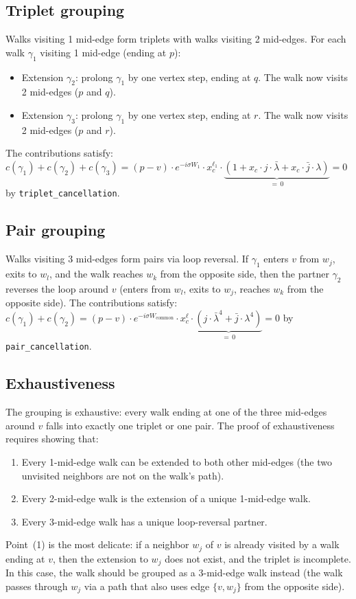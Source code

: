 \subsection{Triplet grouping}

Walks visiting 1 mid-edge form triplets with walks visiting 2 mid-edges.
For each walk $\gamma_1$ visiting 1 mid-edge (ending at $p$):
\begin{itemize}
\item Extension $\gamma_2$: prolong $\gamma_1$ by one vertex step, ending at $q$.
  The walk now visits 2 mid-edges ($p$ and $q$).
\item Extension $\gamma_3$: prolong $\gamma_1$ by one vertex step, ending at $r$.
  The walk now visits 2 mid-edges ($p$ and $r$).
\end{itemize}
The contributions satisfy:
$c(\gamma_1) + c(\gamma_2) + c(\gamma_3) =
(p-v) \cdot e^{-i\sigma W_1} \cdot x_c^{\ell_1}
\cdot \underbrace{(1 + x_c \cdot j \cdot \bar{\lambda} + x_c \cdot \bar{j} \cdot \lambda)}_{=\,0} = 0$
by \texttt{triplet\_cancellation}.

\subsection{Pair grouping}

Walks visiting 3 mid-edges form pairs via loop reversal. If $\gamma_1$ enters
$v$ from $w_j$, exits to $w_l$, and the walk reaches $w_k$ from the opposite
side, then the partner $\gamma_2$ reverses the loop around $v$
(enters from $w_l$, exits to $w_j$, reaches $w_k$ from the opposite side).
The contributions satisfy:
$c(\gamma_1) + c(\gamma_2) =
(p-v) \cdot e^{-i\sigma W_{\text{common}}} \cdot x_c^{\ell}
\cdot \underbrace{(j \cdot \bar{\lambda}^4 + \bar{j} \cdot \lambda^4)}_{=\,0} = 0$
by \texttt{pair\_cancellation}.

\subsection{Exhaustiveness}

The grouping is exhaustive: every walk ending at one of the three mid-edges
around $v$ falls into exactly one triplet or one pair. The proof of exhaustiveness
requires showing that:
\begin{enumerate}
\item Every 1-mid-edge walk can be extended to both other mid-edges
  (the two unvisited neighbors are not on the walk's path).
\item Every 2-mid-edge walk is the extension of a unique 1-mid-edge walk.
\item Every 3-mid-edge walk has a unique loop-reversal partner.
\end{enumerate}
Point~(1) is the most delicate: if a neighbor $w_j$ of $v$ is already visited
by a walk ending at $v$, then the extension to $w_j$ does not exist, and the
triplet is incomplete. In this case, the walk should be grouped as a
3-mid-edge walk instead (the walk passes through $w_j$ via a path that
also uses edge $\{v, w_j\}$ from the opposite side).

